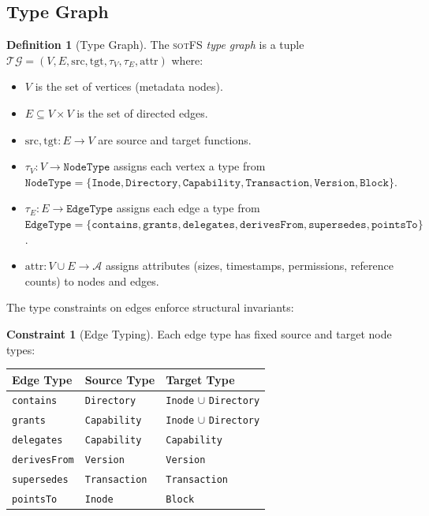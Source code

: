 \documentclass[11pt,a4paper]{article}
\theoremstyle{definition}
\newtheorem{definition}{Definition}[section]
\newtheorem{constraint}{Constraint}[section]
\theoremstyle{remark}
\newcommand{\TG}{\ensuremath{\mathcal{TG}}}
\newcommand{\sotfs}{\textsc{sotFS}}
\newcommand{\NodeType}{\texttt{NodeType}}
\newcommand{\EdgeType}{\texttt{EdgeType}}
\begin{document}
\subsection{Type Graph}
\label{sec:sotfs-typegraph}

\begin{definition}[Type Graph]
\label{def:typegraph}
The \sotfs{} \emph{type graph} is a tuple
$\TG = (V, E, \mathrm{src}, \mathrm{tgt}, \tau_V, \tau_E,
\mathrm{attr})$ where:
\begin{itemize}[leftmargin=1.4em]
\item $V$ is the set of vertices (metadata nodes).
\item $E \subseteq V \times V$ is the set of directed edges.
\item $\mathrm{src}, \mathrm{tgt} : E \to V$ are source and target
  functions.
\item $\tau_V : V \to \NodeType$ assigns each vertex a type from
  $\NodeType = \{\texttt{Inode}, \texttt{Directory},
  \texttt{Capability}, \texttt{Transaction}, \texttt{Version},
  \texttt{Block}\}$.
\item $\tau_E : E \to \EdgeType$ assigns each edge a type from
  $\EdgeType = \{\texttt{contains}, \texttt{grants},
  \texttt{delegates}, \texttt{derivesFrom}, \texttt{supersedes},
  \texttt{pointsTo}\}$.
\item $\mathrm{attr} : V \cup E \to \mathcal{A}$ assigns
  attributes (sizes, timestamps, permissions, reference counts)
  to nodes and edges.
\end{itemize}
\end{definition}

The type constraints on edges enforce structural invariants:

\begin{constraint}[Edge Typing]
\label{con:edge-typing}
Each edge type has fixed source and target node types:
\begin{center}
\begin{tabular}{@{}lll@{}}
\toprule
\textbf{Edge Type} & \textbf{Source Type} & \textbf{Target Type} \\
\midrule
\texttt{contains}    & \texttt{Directory}   & \texttt{Inode} $\cup$ \texttt{Directory} \\
\texttt{grants}      & \texttt{Capability}  & \texttt{Inode} $\cup$ \texttt{Directory} \\
\texttt{delegates}   & \texttt{Capability}  & \texttt{Capability} \\
\texttt{derivesFrom} & \texttt{Version}     & \texttt{Version} \\
\texttt{supersedes}  & \texttt{Transaction} & \texttt{Transaction} \\
\texttt{pointsTo}    & \texttt{Inode}       & \texttt{Block} \\
\bottomrule
\end{tabular}
\end{center}
\end{constraint}
\end{document}
